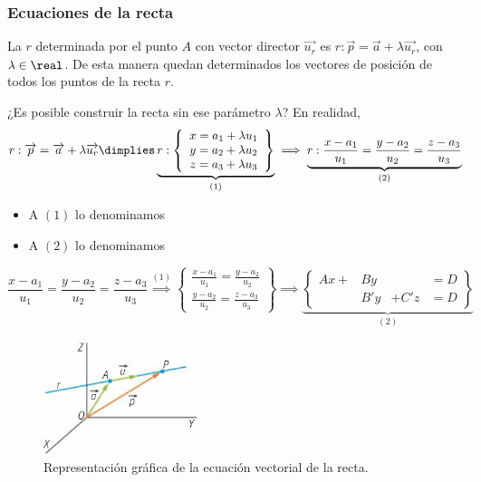 \subsubsection{Ecuaciones de la recta}

La 
%
%
$r$ determinada por el punto $A$ con vector director $\vec{u_r} $  es $r : \vec{p} = \vec{a} + \lambda \vec{u_r}$, con $\lambda\in\real$. De esta manera quedan determinados los vectores de posición de todos los puntos de la recta $r$.

¿Es posible construir la recta sin ese parámetro $\lambda$? En realidad,
$$r : \vec{p} = \vec{a} + \lambda \vec{u_r}\dimplies \underbrace{r:\displaystyle \left\{
\begin{array}{c} 
  x = a_1 + \lambda u_1\\
  y = a_2 + \lambda u_2 \\ 
  z = a_3 + \lambda u_3
\end{array}\right\}}_{(1)} \implies \underbrace{r:\frac{x-a_1}{u_1} = \frac{y-a_2}{u_2} = \frac{z-a_3}{u_3}}_{(2)}$$

\begin{itemize}
    \item A $(1)$ lo denominamos 
    \item A $(2)$ lo denominamos 
\end{itemize}

\[
\frac{x-a_1}{u_1} = \frac{y-a_2}{u_2} = \frac{z-a_3}{u_3}\overset{(1)}{\implies} \left\{
\begin{array}{c}
     \displaystyle\frac{x-a_1}{u_1} = \frac{y-a_2}{u_2}\\
     \displaystyle\frac{y-a_2}{u_2} = \frac{z-a_3}{u_3}
\end{array}\right\} \implies
\underbrace{\left\{\begin{array}{cccc}
     Ax + &By    &     & = D\\
          &B'y   &+ C'z  & = D
\end{array}\right\}}_{(2)}
\]


\begin{figure}[hptb]
    \centering
    \includegraphics[width=0.4\textwidth]{img/EcVectorialRecta.png}
    \caption{Representación gráfica de la ecuación vectorial de la recta.}
    \label{fig:plano}
\end{figure}



